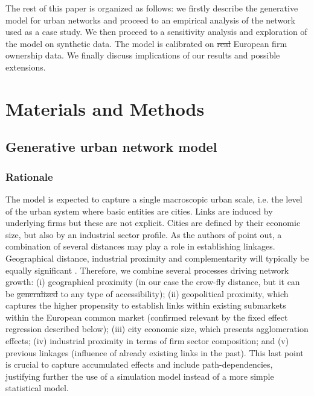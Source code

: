 \documentclass[10pt,letterpaper]{article}
\providecommand{\DIFadd}[1]{{\protect\color{blue}\uwave{#1}}} %
\providecommand{\DIFdel}[1]{{\protect\color{red}\sout{#1}}}                      %
\providecommand{\DIFaddbegin}{} %
\providecommand{\DIFaddend}{} %
\providecommand{\DIFdelbegin}{} %
\providecommand{\DIFdelend}{} %
\begin{document}
The rest of this paper is organized as follows: we firstly describe the generative model for urban networks and proceed to an empirical analysis of the network used as a case study. We then proceed to a sensitivity analysis and exploration of the model on synthetic data. The model is calibrated on \DIFdelbegin \DIFdel{real }\DIFdelend \DIFaddbegin \DIFadd{empirical }\DIFaddend European firm ownership data. We finally discuss implications of our results and possible extensions.

\section*{Materials and Methods}

\subsection*{Generative urban network model}

\subsubsection*{Rationale}

The model is expected to capture a single macroscopic urban scale, i.e. the level of the urban system where basic entities are cities. Links are induced by underlying firms but these are not explicit. Cities are defined by their economic size, but also by an industrial sector profile. As the authors of \cite{martinus2018global} point out, a combination of several distances may play a role in establishing linkages. Geographical distance, industrial proximity and complementarity will typically be equally significant \cite{cottineau2020nested}. Therefore, we combine several processes driving network growth: (i) geographical proximity (in our case the crow-fly distance, but it can be \DIFdelbegin \DIFdel{generalized }\DIFdelend \DIFaddbegin \DIFadd{generalised }\DIFaddend to any type of accessibility); (ii) geopolitical proximity, which captures the higher propensity to establish links within existing submarkets within the European common market (confirmed relevant by the fixed effect regression described below); (iii) city economic size, which presents agglomeration effects; (iv) industrial proximity in terms of firm sector composition; and (v) previous linkages (influence of already existing links in the past). This last point is crucial to capture accumulated effects and include path-dependencies, justifying further the use of a simulation model instead of a more simple statistical model.
\end{document}
